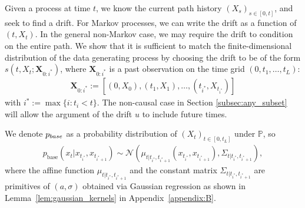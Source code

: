 \documentclass{article}
\newcommand{\pbase}{p_{\normalfont{base}}}
\begin{document}
Given a process at time $t$, we know the current path history $(X_s)_{s\in [0,t]}$, and seek to find a drift. For Markov processes, we can write the drift as a function of $(t,X_t)$. In the general non-Markov case, we may require the drift to condition on the entire path. We show that it is sufficient to match the finite-dimensional distribution of the data generating process by choosing the drift to be of the form $s\left(t,X_t; \mathbf{X}_{0:i^*}\right)$, where $\mathbf{X}_{0:i^*}$ is a past observation on the time grid $(0, t_1, \dots, t_L)$:
\begin{align}
    \mathbf{X}_{0:i^*} := \left[(0, X_0), (t_1, X_1), \dots, (t_{i^*}, X_{t_{i^*}})\right] \label{eqn:all_states}
\end{align}
with $i^* := \max\{i: t_i < t\}$. The non-causal case in Section \ref{subsec:any_subset} will allow the argument of the drift $u$ to include future times.

We denote $\pbase$ as a probability distribution of $(X_t)_{t\in [0, t_L]}$ under $\mathbb{P}$, so
\begin{align}
    p_\text{base}(x_t | x_{t_{i^*}}, x_{t_{i^*+1}}) \sim \mathcal{N}\left(\mu_{t | t_{i^*}, t_{i^*+1}}(x_{t_{i^*}}, x_{t_{i^*+1}}), \Sigma_{t | t_{i^*}, t_{i^*+1}}\right), \label{eqn:sampling_dist_noising_kernel_main}
\end{align}
where the affine function $\mu_{t | t_{i^*}, t_{i^*+1}}$ and the constant matrix $\Sigma_{t | t_{i^*}, t_{i^*+1}}$ are primitives of $(a, \sigma)$ obtained via Gaussian regression as shown in Lemma~\ref{lem:gaussian_kernels} in Appendix~\ref{appendix:B}.
\end{document}
